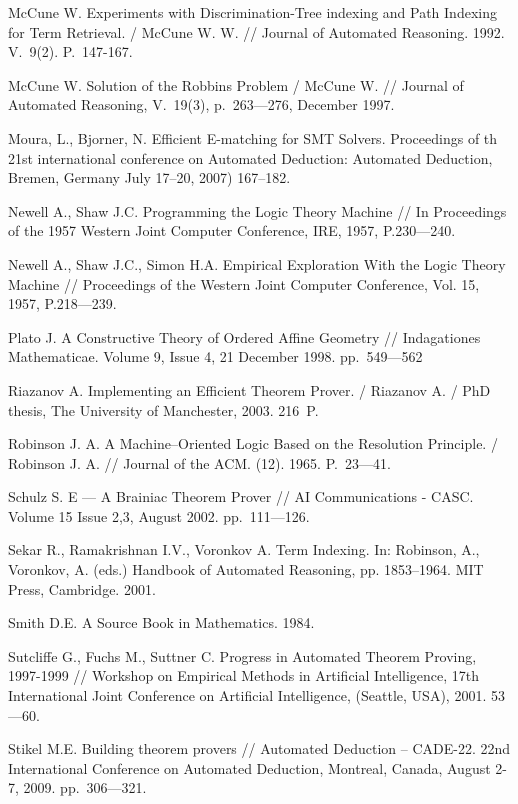\begin{thebibliography}{99}
 McCune W. Experiments with Discrimination-Tree indexing and Path Indexing for Term Retrieval. / McCune W. W. // Journal of Automated Reasoning. 1992. V.~9(2). P.~147-167.

 McCune W. Solution of the Robbins Problem / McCune W. // Journal of Automated Reasoning, V.~19(3), p.~263---276, December 1997.

 Moura, L., Bjorner, N. Efficient E-matching for SMT Solvers. Proceedings of th 21st international conference on Automated Deduction: Automated Deduction, Bremen, Germany July 17--20, 2007) 167--182.

 Newell A., Shaw J.C. Programming the Logic Theory Machine // In Proceedings of the 1957 Western Joint Computer Conference, IRE, 1957, P.230---240.

 Newell A., Shaw J.C., Simon H.A. Empirical Exploration With the Logic Theory Machine // Proceedings of the Western Joint Computer Conference, Vol. 15, 1957, P.218---239.

 Plato J. A Constructive Theory of Ordered Affine Geometry // Indagationes Mathematicae. Volume 9, Issue 4, 21 December 1998. pp.~549---562

 Riazanov A. Implementing an Efficient Theorem Prover. / Riazanov A. /  PhD thesis, The University of Manchester, 2003. 216~P.

 Robinson J. A. A Machine--Oriented Logic Based on the Resolution Principle. / Robinson J. A. //  Journal of the ACM. (12). 1965. P.~23---41.

 Schulz S. E --- A Brainiac Theorem Prover // AI Communications - CASC. Volume 15 Issue 2,3, August 2002. pp.~111---126.

 Sekar R., Ramakrishnan I.V., Voronkov A. Term Indexing. In: Robinson, A., Voronkov, A. (eds.) Handbook of Automated Reasoning, pp. 1853--1964. MIT Press, Cambridge. 2001.

 Smith D.E. A Source Book in Mathematics. 1984.

 Sutcliffe G., Fuchs M., Suttner C. Progress in Automated Theorem Proving, 1997-1999 // Workshop on Empirical Methods in Artificial Intelligence, 17th International Joint Conference on Artificial Intelligence, (Seattle, USA), 2001. 53---60.

 Stikel M.E. Building theorem provers // Automated Deduction – CADE-22. 22nd International Conference on Automated Deduction, Montreal, Canada, August 2-7, 2009. pp.~306---321.


\end{thebibliography}
